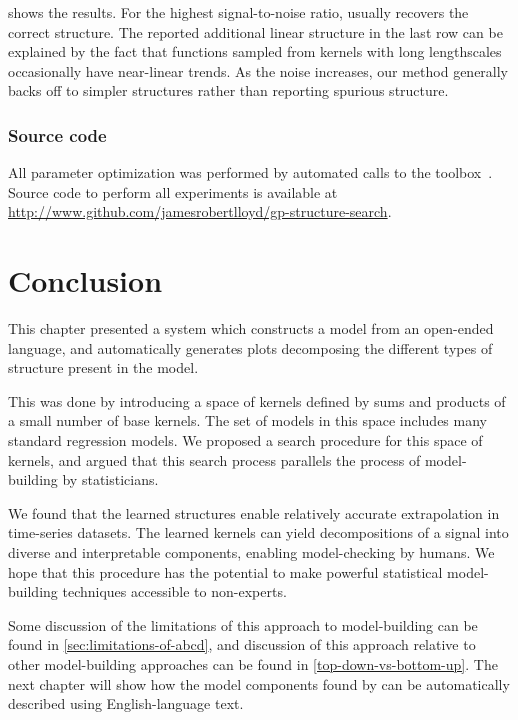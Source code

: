  shows the results.
For the highest signal-to-noise ratio, \procedurename{} usually recovers the correct structure.
The reported additional linear structure in the last row can be explained by the fact that functions sampled from \kSE{} kernels with long lengthscales occasionally have near-linear trends.
As the noise increases, our method generally backs off to simpler structures rather than reporting spurious structure.

\subsubsection{Source code}
All \gp{} parameter optimization was performed by automated calls to the \GPML{} toolbox~\citep{GPML}.
Source code to perform all experiments is available at \url{http://www.github.com/jamesrobertlloyd/gp-structure-search}.




\section{Conclusion}

This chapter presented a system which constructs a model from an open-ended language, and automatically generates plots decomposing the different types of structure present in the model.

This was done by introducing a space of kernels defined by sums and products of a small number of base kernels.  
The set of models in this space includes many standard regression models.
We proposed a search procedure for this space of kernels, and argued that this search process parallels the process of model-building by statisticians.

We found that the learned structures enable relatively accurate extrapolation in time-series datasets. %
The learned kernels can yield decompositions of a signal into diverse and interpretable components, enabling model-checking by humans.
We hope that this procedure has the potential to make powerful statistical model-building techniques accessible to non-experts.

Some discussion of the limitations of this approach to model-building can be found in \cref{sec:limitations-of-abcd}, and discussion of this approach relative to other model-building approaches can be found in \cref{top-down-vs-bottom-up}.
The next chapter will show how the model components found by \procedurename{} can be automatically described using English-language text.




